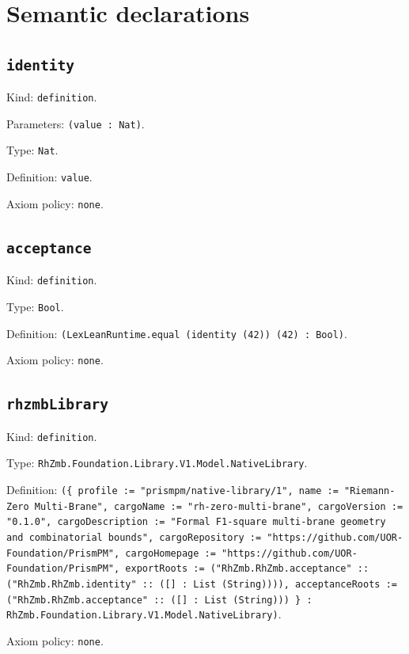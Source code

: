 \documentclass[11pt]{article}
\begin{document}
\section*{Semantic declarations}
\subsection*{\texttt{identity}}
\noindent Kind: \texttt{definition}.\par
\noindent Parameters: \texttt{(value : Nat)}.\par
\noindent Type: \texttt{Nat}.\par
\noindent Definition: \texttt{value}.\par
\noindent Axiom policy: \texttt{none}.\par
\subsection*{\texttt{acceptance}}
\noindent Kind: \texttt{definition}.\par
\noindent Type: \texttt{Bool}.\par
\noindent Definition: \texttt{(LexLeanRuntime.equal (identity (42)) (42) : Bool)}.\par
\noindent Axiom policy: \texttt{none}.\par
\subsection*{\texttt{rhzmbLibrary}}
\noindent Kind: \texttt{definition}.\par
\noindent Type: \texttt{RhZmb.Foundation.Library.V1.Model.NativeLibrary}.\par
\noindent Definition: \texttt{(\{ profile := "prismpm/native-library/1", name := "Riemann-Zero Multi-Brane", cargoName := "rh-zero-multi-brane", cargoVersion := "0.1.0", cargoDescription := "Formal F1-square multi-brane geometry and combinatorial bounds", cargoRepository := "https://github.com/UOR-Foundation/PrismPM", cargoHomepage := "https://github.com/UOR-Foundation/PrismPM", exportRoots := ("RhZmb.RhZmb.acceptance" :: ("RhZmb.RhZmb.identity" :: ([] : List (String)))), acceptanceRoots := ("RhZmb.RhZmb.acceptance" :: ([] : List (String))) \} : RhZmb.Foundation.Library.V1.Model.NativeLibrary)}.\par
\noindent Axiom policy: \texttt{none}.\par
\end{document}
